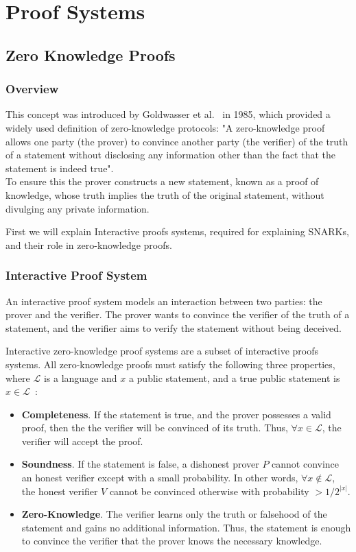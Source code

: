 \chapter{Proof Systems}
\label{sec:proof-theory}
\section{Zero Knowledge Proofs}
\subsection*{Overview}
This concept was introduced by Goldwasser et al.~\cite{goldwasser1985knowledge} in 1985, which provided a widely used definition of zero-knowledge protocols: "A zero-knowledge proof allows one party (the prover) to convince another party (the verifier) of the truth of a statement without disclosing any information other than the fact that the statement is indeed true".\\To ensure this the prover constructs a new statement, known as a proof of knowledge, whose truth implies the truth of the original statement, without divulging any private information.

First we will explain Interactive proofs systems, required for explaining SNARKs, and their role in zero-knowledge proofs.

\subsection{Interactive Proof System}
An interactive proof system models an interaction between two parties: the prover and the verifier. The prover wants to convince the verifier of the truth of a statement, and the verifier aims to verify the statement without being deceived.

Interactive zero-knowledge proof systems are a subset of interactive proofs systems. All zero-knowledge proofs must satisfy the following three properties, where $\mathcal{L}$ is a language and $x$ a public statement, and a true public statement is $x\in\mathcal{L}$~\cite{fortnow1989complexity}:
\begin{itemize}
    \item \textbf{Completeness}. If the statement is true, and the prover possesses a valid proof, then the the verifier will be convinced of its truth. Thus, $\forall x\in\mathcal{L}$, the verifier will accept the proof.
    \item \textbf{Soundness}. If the statement is false, a dishonest prover $P$ cannot convince an honest verifier except with a small probability. In other words, $\forall x\notin\mathcal{L}$, the honest verifier $V$ cannot be convinced otherwise with probability $>1/2^{|x|}$.
    \item \textbf{Zero-Knowledge}. The verifier learns only the truth or falsehood of the statement and gains no additional information. Thus, the statement is enough to convince the verifier that the prover knows the necessary knowledge.
\end{itemize}

